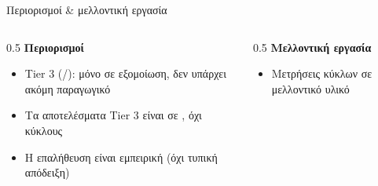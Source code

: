 \begin{frame}{Περιορισμοί \& μελλοντική εργασία}
  \begin{columns}[T,onlytextwidth]
    \begin{column}{0.5\textwidth}
      \textbf{Περιορισμοί}
      \begin{itemize}
        \item Tier 3 (\Zvbc/\Zvbb): μόνο σε εξομοίωση, δεν υπάρχει ακόμη παραγωγικό 
        \item Τα αποτελέσματα Tier 3 είναι σε \instret, όχι κύκλους
        \ifincludeCT\item Η  επαλήθευση είναι εμπειρική (όχι τυπική απόδειξη)\fi
      \end{itemize}
    \end{column}
    \begin{column}{0.5\textwidth}
      \textbf{Μελλοντική εργασία}
      \begin{itemize}
        \item Μετρήσεις κύκλων σε μελλοντικό  υλικό
      \end{itemize}
    \end{column}
  \end{columns}
\end{frame}
